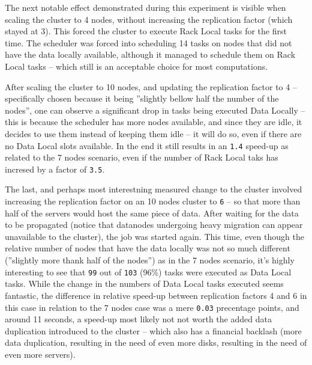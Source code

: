 The next notable effect demonstrated during this experiment is visible when scaling the cluster to 4 nodes, without increasing the replication factor (which stayed at 3). This forced the cluster to execute Rack Local tasks for the first time. The scheduler was forced into scheduling 14 tasks on nodes that did not have the data locally available, although it managed to schedule them on Rack Local tasks -- which still is an acceptable choice for most computations.

After scaling the cluster to 10 nodes, and updating the replication factor to 4 -- specifically chosen because it being ''slightly bellow half the number of the nodes'', one can observe a significant drop in tasks being executed Data Locally -- this is because the scheduler has more nodes available, and since they are idle, it decides to use them instead of keeping them idle -- it will do so, even if there are no Data Local slots available. In the end it still results in an \verb|1.4| speed-up as related to the 7 nodes scenario, even if the number of Rack Local taks has incresed by a factor of \verb|3.5|.

The last, and perhaps most interestning measured change to the cluster involved increasing the replication factor on an 10 nodes cluster to \verb|6| -- so that more than half of the servers would host the same piece of data. After waiting for the data to be propagated (notice that datanodes undergoing heavy migration can appear unavailable to the cluster), the job was started again. This time, even though the relative number of nodes that have the data locally was not so much different (''slightly more thank half of the nodes'') as in the 7 nodes scenario, it's highly interesting to see that \verb|99| out of \verb|103| (96\%) tasks were executed as Data Local tasks. While the change in the numbers of Data Local tasks executed seems fantastic, the difference in relative speed-up between replication factors 4 and 6 in this case in relation to the 7 nodes case was a mere \verb|0.03| precentage points, and around 11 seconds, a speed-up most likely not not worth the added data duplication introduced to the cluster -- which also has a financial backlash (more data duplication, resulting in the need of even more disks, resulting in the need of even more servers).

